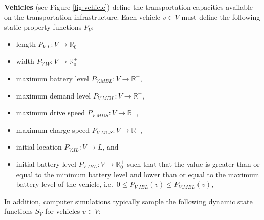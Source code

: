 \documentclass[graybox]{svmult}
\begin{document}
\vspace{2mm}
\noindent
\textbf{Vehicles} (see Figure \ref{fig:vehicle})
 define the transportation capacities available on the transportation infrastructure. Each vehicle $v \in V$ must define the following static property functions $P_V$:
\begin{itemize}
	\item length $P_{V.L}: V \rightarrow \mathbb{R}_0^+$
	\item width $P_{V.W}: V \rightarrow \mathbb{R}_0^+$  
	\item maximum battery level $P_{V.MBL}: V \rightarrow \mathbb{R}^+$,
	\item maximum demand level $P_{V.MDL}: V \rightarrow \mathbb{R}^+$,
	\item maximum drive speed $P_{V.MDS}: V \rightarrow \mathbb{R}^+$,
	\item maximum charge speed $P_{V.MCS}: V \rightarrow \mathbb{R}^+$,
	\item initial location $P_{V.IL}: V \rightarrow L$, and
	\item initial battery level $P_{V.IBL}: V \rightarrow \mathbb{R}_0^+$ such that that the value is greater than or equal to the minimum battery level and lower than or equal to the maximum battery level of the vehicle, i.e.\ $0 \leq P_{V.IBL}(v) \leq P_{V.MBL}(v)$,
\end{itemize}
In addition, computer simulations typically sample the following dynamic state functions $S_{V}$ for vehicles $v \in V$:
\end{document}

